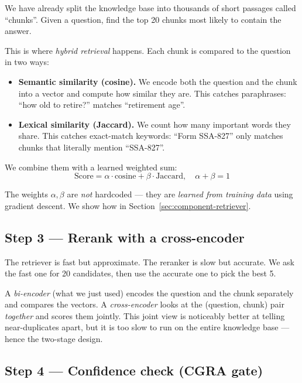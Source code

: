 \documentclass[11pt,a4paper]{article}
\begin{document}
\begin{keyidea}
We have already split the knowledge base into thousands of short passages called ``chunks''. Given a question, find the top 20 chunks most likely to contain the answer.
\end{keyidea}

This is where \emph{hybrid retrieval} happens. Each chunk is compared to the question in two ways:

\begin{itemize}[leftmargin=*, itemsep=2pt]
\item \textbf{Semantic similarity (cosine).} We encode both the question and the chunk into a vector and compute how similar they are. This catches paraphrases: ``how old to retire?'' matches ``retirement age''.
\item \textbf{Lexical similarity (Jaccard).} We count how many important words they share. This catches exact-match keywords: ``Form SSA-827'' only matches chunks that literally mention ``SSA-827''.
\end{itemize}

We combine them with a learned weighted sum:
\[ \text{Score} = \alpha \cdot \text{cosine} + \beta \cdot \text{Jaccard}, \quad \alpha+\beta=1 \]

The weights $\alpha, \beta$ are \emph{not} hardcoded --- they are \emph{learned from training data} using gradient descent. We show how in Section~\ref{sec:component-retriever}.

\subsection{Step 3 --- Rerank with a cross-encoder}

\begin{keyidea}
The retriever is fast but approximate. The reranker is slow but accurate. We ask the fast one for 20 candidates, then use the accurate one to pick the best 5.
\end{keyidea}

A \emph{bi-encoder} (what we just used) encodes the question and the chunk separately and compares the vectors. A \emph{cross-encoder} looks at the (question, chunk) pair \emph{together} and scores them jointly. This joint view is noticeably better at telling near-duplicates apart, but it is too slow to run on the entire knowledge base --- hence the two-stage design.

\subsection{Step 4 --- Confidence check (CGRA gate)}
\end{document}
